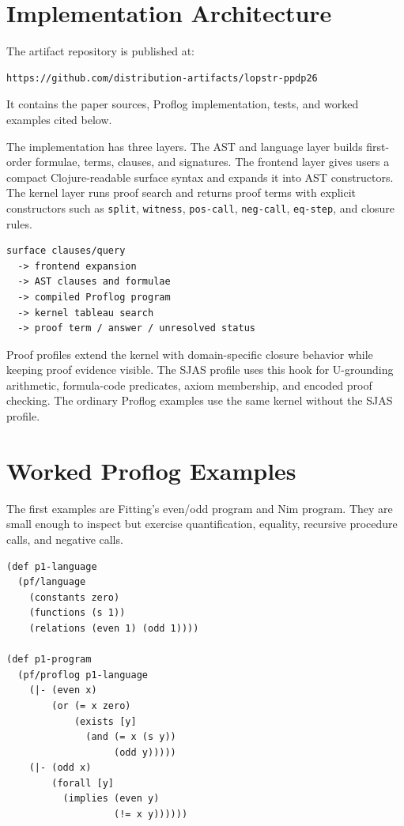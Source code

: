 \documentclass[runningheads]{llncs}
\begin{document}
\section{Implementation Architecture}

The artifact repository is published at:

\begin{lstlisting}
https://github.com/distribution-artifacts/lopstr-ppdp26
\end{lstlisting}

It contains the paper sources, Proflog implementation, tests, and worked
examples cited below.

The implementation has three layers.  The AST and language layer builds
first-order formulae, terms, clauses, and signatures.  The frontend layer gives
users a compact Clojure-readable surface syntax and expands it into AST
constructors.  The kernel layer runs proof search and returns proof terms with
explicit constructors such as \texttt{split}, \texttt{witness},
\texttt{pos-call}, \texttt{neg-call}, \texttt{eq-step}, and closure rules.

\begin{lstlisting}
surface clauses/query
  -> frontend expansion
  -> AST clauses and formulae
  -> compiled Proflog program
  -> kernel tableau search
  -> proof term / answer / unresolved status
\end{lstlisting}

Proof profiles extend the kernel with domain-specific closure behavior while
keeping proof evidence visible.  The SJAS profile uses this hook for
U-grounding arithmetic, formula-code predicates, axiom membership, and encoded
proof checking.  The ordinary Proflog examples use the same kernel without the
SJAS profile.

\section{Worked Proflog Examples}

The first examples are Fitting's even/odd program and Nim program.  They are
small enough to inspect but exercise quantification, equality, recursive
procedure calls, and negative calls.

\begin{lstlisting}
(def p1-language
  (pf/language
    (constants zero)
    (functions (s 1))
    (relations (even 1) (odd 1))))

(def p1-program
  (pf/proflog p1-language
    (|- (even x)
        (or (= x zero)
            (exists [y]
              (and (= x (s y))
                   (odd y)))))
    (|- (odd x)
        (forall [y]
          (implies (even y)
                   (!= x y))))))
\end{lstlisting}
\end{document}
